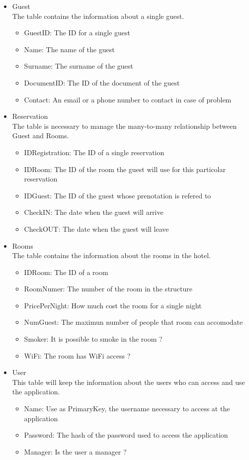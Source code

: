 \begin{itemize}
  \item Guest \\ 
    The table contains the information about a single guest.
    \begin{itemize}
      \item GuestID: The ID for a single guest
      \item Name: The name of the guest
      \item Surname: The surname of the guest
      \item DocumentID: The ID of the document of the guest
      \item Contact: An email or a phone number to contact in case of problem
    \end{itemize}
  \item Reservation \\
    The table is necessary to manage the many-to-many relationship between Guest and Rooms.
    \begin{itemize}
      \item IDRegistration: The ID of a single reservation
      \item IDRoom: The ID of the room the guest will use for this particolar reservation
      \item IDGuest: The ID of the guest whose prenotation is refered to
      \item CheckIN: The date when the guest will arrive
      \item CheckOUT: The date when the guest will leave
    \end{itemize}    
  \item Rooms \\
    The table contains the information about the rooms in the hotel.
    \begin{itemize}
      \item IDRoom: The ID of a room
      \item RoomNumer: The number of the room in the structure
      \item PricePerNight: How much cost the room for a single night  
      \item NumGuest: The maximun number of people that room can accomodate
      \item Smoker: It is possible to smoke in the room ?
      \item WiFi: The room has WiFi access ?
    \end{itemize}
  \item User \\
    This table will keep the information about the users who can access and use the application.
    \begin{itemize}
      \item Name: Use as PrimaryKey, the username necessary to access at the application
      \item Password: The hash of the password used to access the application
      \item Manager: Is the user a manager ?
    \end{itemize}
\end{itemize}



